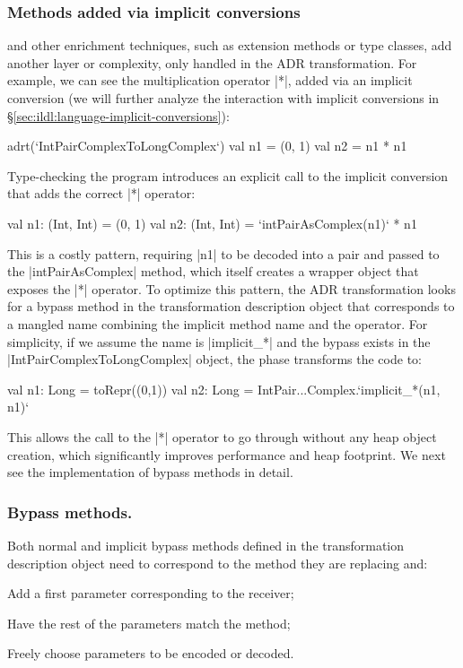\subsubsection{Methods added via implicit conversions} and other enrichment techniques, such as extension methods or type classes, add another layer or complexity, only handled in the ADR transformation. For example, we can see the multiplication operator |*|, added via an implicit conversion (we will further analyze the interaction with implicit conversions in \S\ref{sec:ildl:language-implicit-conversions}):

\begin{lstlisting-nobreak}
adrt(`IntPairComplexToLongComplex`) {
  val n1 = (0, 1)
  val n2 = n1 * n1
}
\end{lstlisting-nobreak}

Type-checking the program introduces an explicit call to the implicit conversion that adds the correct |*| operator:

\begin{lstlisting-nobreak}
val n1: (Int, Int) = (0, 1)
val n2: (Int, Int) = `intPairAsComplex(n1)` * n1
\end{lstlisting-nobreak}

This is a costly pattern, requiring |n1| to be decoded into a pair and passed to the |intPairAsComplex| method, which itself creates a wrapper object that exposes the |*| operator. To optimize this pattern, the ADR transformation looks for a bypass method in the transformation description object that corresponds to a mangled name combining the implicit method name and the operator. For simplicity, if we assume the name is |implicit_*| and the bypass exists in the |IntPairComplexToLongComplex| object, the \coerce{} phase transforms the code to:

\begin{lstlisting-nobreak}
val n1: Long = toRepr((0,1))
val n2: Long = IntPair...Complex.`implicit_*(n1, n1)`
\end{lstlisting-nobreak}

This allows the call to the |*| operator to go through without any heap object creation, which significantly improves performance and heap footprint. We next see the implementation of bypass methods in detail.

\subsubsection{Bypass methods.} Both normal and implicit bypass methods defined in the transformation description object need to correspond to the method they are replacing and:
\begin{compactitem}
\item Add a first parameter corresponding to the receiver;
\item Have the rest of the parameters match the method;
\item Freely choose parameters to be encoded or decoded.
\end{compactitem}

